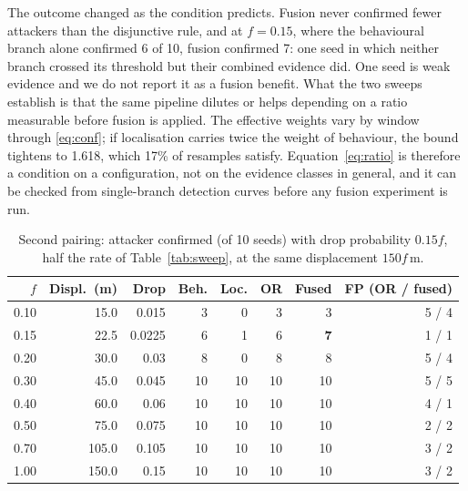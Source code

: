 The outcome changed as the condition predicts. Fusion never confirmed
fewer attackers than the disjunctive rule, and at $f = 0.15$, where the
behavioural branch alone confirmed 6 of 10, fusion confirmed 7: one seed
in which neither branch crossed its threshold but their combined evidence
did. One seed is weak evidence and we do not report it as a fusion
benefit. What the two sweeps establish is that the same pipeline dilutes
or helps depending on a ratio measurable before fusion is applied. The
effective weights vary by window through \eqref{eq:conf}; if localisation
carries twice the weight of behaviour, the bound tightens to 1.618, which
17\% of resamples satisfy. Equation~\eqref{eq:ratio} is therefore a
condition on a configuration, not on the evidence classes in general, and
it can be checked from single-branch detection curves before any fusion
experiment is run.

\begin{table}[!t]
\caption{Second pairing: attacker confirmed (of 10 seeds) with drop
probability $0.15f$, half the rate of Table~\ref{tab:sweep}, at the same
displacement $150f$\,m.}
\label{tab:sweep2}
\centering
\small
\setlength{\tabcolsep}{4pt}
\begin{tabular}{@{}rrrrrrrr@{}}
\hline
$f$ & Displ.\ (m) & Drop & Beh. & Loc. & OR & Fused & FP (OR / fused) \\
\hline
0.10 & 15.0 & 0.015 & 3 & 0 & 3 & 3 & 5 / 4 \\
0.15 & 22.5 & 0.0225 & 6 & 1 & 6 & \textbf{7} & 1 / 1 \\
0.20 & 30.0 & 0.03 & 8 & 0 & 8 & 8 & 5 / 4 \\
0.30 & 45.0 & 0.045 & 10 & 10 & 10 & 10 & 5 / 5 \\
0.40 & 60.0 & 0.06 & 10 & 10 & 10 & 10 & 4 / 1 \\
0.50 & 75.0 & 0.075 & 10 & 10 & 10 & 10 & 2 / 2 \\
0.70 & 105.0 & 0.105 & 10 & 10 & 10 & 10 & 3 / 2 \\
1.00 & 150.0 & 0.15 & 10 & 10 & 10 & 10 & 3 / 2 \\
\hline
\end{tabular}
\end{table}

